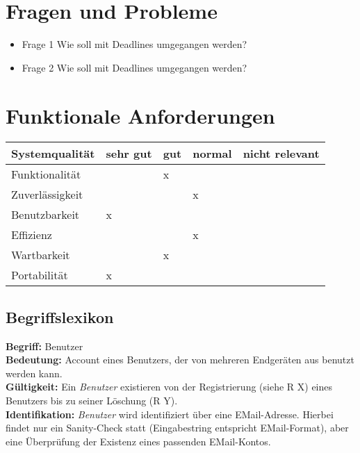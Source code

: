 \documentclass{article}
\begin{document}
\section{Fragen und Probleme}
\begin{itemize}
\item{Frage 1} Wie soll mit Deadlines umgegangen werden?
\item{Frage 2} Wie soll mit Deadlines umgegangen werden?
\end{itemize}

\section{Funktionale Anforderungen}

\begin{tabularx}{0.8\textwidth} { 
  | >{\raggedright\arraybackslash}X 
  | >{\centering\arraybackslash}X 
  | >{\centering\arraybackslash}X 
  | >{\centering\arraybackslash}X 
  | >{\raggedleft\arraybackslash}X | }
 \hline
 Systemqualität & sehr gut & gut & normal & nicht relevant \\
 \hline
 Funktionalität  &   & x &  &   \\
 \hline
 Zuverlässigkeit  &   &  & x &   \\
\hline
 Benutzbarkeit  & x  &  &  &   \\
 \hline
 Effizienz  &   &  & x &   \\
 \hline
 Wartbarkeit  &   & x &  &   \\
 \hline
 Portabilität  & x  &  &  &   \\
 \hline
\end{tabularx}

\subsection{Begriffslexikon}

\begin{samepage}
\textbf{Begriff:} Benutzer \\
\textbf{Bedeutung:} Account eines Benutzers, der von mehreren Endgeräten aus benutzt werden kann. \\
\textbf{Gültigkeit:} Ein \textit{Benutzer} existieren von der Registrierung (siehe R X) eines Benutzers bis zu seiner Löschung (R Y). \\
\textbf{Identifikation:} \textit{Benutzer} wird identifiziert über eine EMail-Adresse. Hierbei findet nur ein Sanity-Check statt (Eingabestring entspricht EMail-Format), aber eine Überprüfung der Existenz eines passenden EMail-Kontos. \\
\end{samepage}
\end{document}
